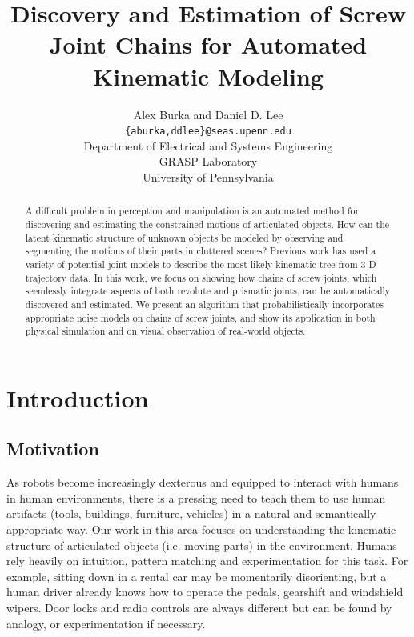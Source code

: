 \documentclass[letterpaper, 10 pt, conference]{ieeeconf}  %
\title{\LARGE \bf
Discovery and Estimation of Screw Joint Chains for
Automated Kinematic Modeling
}
\author{Alex Burka and Daniel D. Lee\\
  {\tt \{aburka,ddlee\}@seas.upenn.edu}\\
  Department of Electrical and Systems Engineering\\
  GRASP Laboratory\\
  University of Pennsylvania
}
\begin{document}
\maketitle
\thispagestyle{empty}
\pagestyle{empty}


\begin{abstract}
  A difficult problem in perception and manipulation is an automated
  method for discovering and estimating the constrained motions of
  articulated objects.  How can the latent kinematic structure of
  unknown objects be modeled by observing and segmenting the motions
  of their parts in cluttered scenes?  Previous work has used a
  variety of potential joint models to describe the most likely
  kinematic tree from 3-D trajectory data.  In this work, we focus on
  showing how chains of screw joints, which seemlessly integrate
  aspects of both revolute and prismatic joints, can be automatically
  discovered and estimated.  We present an algorithm that
  probabilistically incorporates appropriate noise models on chains of
  screw joints, and show its application in both physical simulation and on
  visual observation of real-world objects.
\end{abstract}



\section{Introduction}

\subsection{Motivation}
As robots become increasingly dexterous and equipped to interact with humans in human environments, there is a pressing need to teach them to use human artifacts (tools, buildings, furniture, vehicles) in a natural and semantically appropriate way. Our work in this area focuses on understanding the kinematic structure of articulated objects (i.e. moving parts) in the environment. Humans rely heavily on intuition, pattern matching and experimentation for this task. For example, sitting down in a rental car may be momentarily disorienting, but a human driver already knows how to operate the pedals, gearshift and windshield wipers. Door locks and radio controls are always different but can be found by analogy, or experimentation if necessary.
\end{document}
